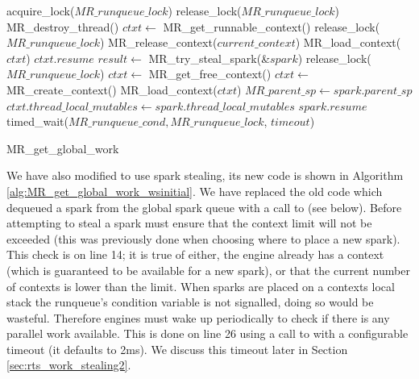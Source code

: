 \begin{algorithm}
\begin{algorithmic}[1]
  \State acquire\_lock($MR\_runqueue\_lock$)
  \Loop
      \State release\_lock($MR\_runqueue\_lock$)
      \State MR\_destroy\_thread()
    \EndIf
    \State $ctxt \gets$ MR\_get\_runnable\_context()
      \State release\_lock($MR\_runqueue\_lock$)
        \State MR\_release\_context($current\_context$)
      \EndIf
      \State MR\_load\_context($ctxt$)
      \Goto $ctxt.resume$
    \EndIf
      \State $result \gets$ MR\_try\_steal\_spark(\&$spark$)
        \State release\_lock($MR\_runqueue\_lock$)
          \State $ctxt \gets$ MR\_get\_free\_context()
            \State $ctxt \gets$ MR\_create\_context()
          \EndIf
          \State MR\_load\_context($ctxt$)
        \EndIf
        \State $MR\_parent\_sp \gets spark.parent\_sp$
        \State $ctxt.thread\_local\_mutables \gets
          spark.thread\_local\_mutables$
        \Goto $spark.resume$
      \EndIf
    \EndIf
    \State timed\_wait($MR\_runqueue\_cond, MR\_runqueue\_lock$, $timeout$)
  \EndLoop
\EndProcedure
\end{algorithmic}
\caption{MR\_get\_global\_work}
\label{alg:MR_get_global_work_wsinitial}
\end{algorithm}

We have also modified \getglobalwork to use spark stealing,
its new code is shown in Algorithm \ref{alg:MR_get_global_work_wsinitial}.
We have replaced the old code which dequeued a spark from the global spark
queue
with a call to \trystealspark (see below).
Before attempting to steal a spark \getglobalwork must ensure that the context limit
will not be exceeded
(this was previously done when choosing where to place a new spark).
This check is on line 14; it is true of either,
the engine already has a context (which is guaranteed to be available for a
new spark), 
or that the current number of contexts is lower than the limit.
When sparks are placed on a contexts local stack the runqueue's condition
variable is not signalled,
doing so would be wasteful.
Therefore engines must wake up periodically to check if there is any
parallel work available.
This is done on line 26 using a call to  with a
configurable timeout (it defaults to 2ms).
We discuss this timeout later in Section \ref{sec:rts_work_stealing2}.

